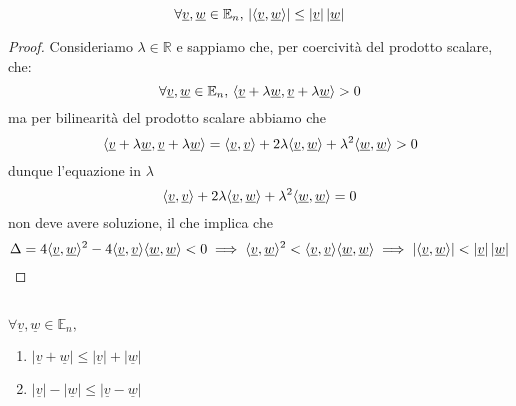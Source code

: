 \begin{prop}
$$\forall \underline{v}, \underline{w} \in \mathbb{E}_n, \, | \langle \underline{v}, \underline{w} \rangle | \leq |\underline{v}| \, |\underline{w}|$$
\label{prop:dis_cs}
\end{prop}
\begin{proof}
Consideriamo $\lambda \in \mathbb{R}$ e sappiamo che, per coercività del prodotto scalare, che:
$$
\forall \underline{v}, \underline{w} \in \mathbb{E}_n, \, \langle \underline{v} + \lambda \underline{w}, \underline{v} + \lambda \underline{w} \rangle > 0
$$
ma per bilinearità del prodotto scalare abbiamo che
$$
\langle \underline{v} + \lambda \underline{w}, \underline{v} + \lambda \underline{w} \rangle = \langle \underline{v}, \underline{v} \rangle + 2\lambda \langle \underline{v}, \underline{w} \rangle + \lambda^2 \langle \underline{w}, \underline{w} \rangle> 0
$$
dunque l'equazione in $\lambda$
$$
\langle \underline{v}, \underline{v} \rangle + 2\lambda \langle \underline{v}, \underline{w} \rangle + \lambda^2 \langle \underline{w}, \underline{w} \rangle = 0
$$
non deve avere soluzione, il che implica che
$$
\Delta = 4\langle \underline{v}, \underline{w} \rangle^2 - 4 \langle \underline{v}, \underline{v} \rangle \langle \underline{w}, \underline{w} \rangle < 0 \implies \langle \underline{v}, \underline{w} \rangle^2 < \langle \underline{v}, \underline{v} \rangle \langle \underline{w}, \underline{w} \rangle \implies |\langle \underline{v}, \underline{w} \rangle| < |\underline{v}| \, |\underline{w}|
$$
\end{proof}
\begin{prop} \hfill \\
$ \forall \underline{v}, \underline{w} \in \mathbb{E}_n, $
\begin{enumerate}[label=\protect\circled{\arabic*}]
	\item $|\underline{v} + \underline{w}| \leq |\underline{v}| + |\underline{w}|$
	\item $|\underline{v}| - |\underline{w}| \leq |\underline{v} - \underline{w}|$
\end{enumerate}
\label{prop:dis_triang}
\end{prop}
